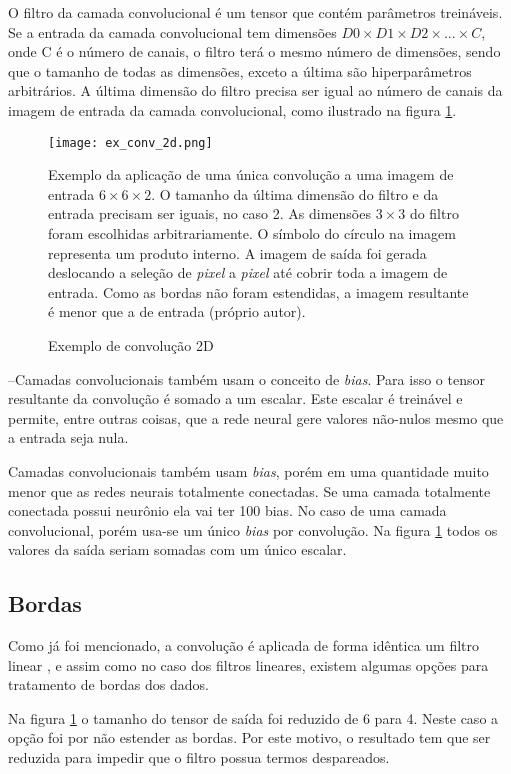 O filtro da camada convolucional é um tensor que contém parâmetros treináveis.
Se a entrada da camada convolucional tem dimensões
$D0 \times D1 \times D2 \times ... \times C$, onde C é o número de canais,
o filtro terá o mesmo número de dimensões, sendo que o tamanho de todas
as dimensões, exceto a última são
hiperparâmetros arbitrários. A última dimensão do filtro precisa ser igual ao
número de canais da imagem de entrada da camada convolucional, como ilustrado na
figura \ref{fig:ex_conv_2d}.


\begin{figure}[!htb]
	\centering
	\texttt{[image: ex\_conv\_2d.png]}
	\caption{Exemplo de convolução 2D}
	\label{fig:ex_conv_2d}
	Exemplo da aplicação de uma única convolução a uma imagem de
	entrada $6 \times 6 \times 2$. O tamanho da última dimensão do filtro e
	da entrada precisam ser iguais, no caso 2. As dimensões $3 \times 3$ do
	filtro foram escolhidas arbitrariamente. O símbolo do círculo na imagem
	representa um produto interno. A imagem de saída foi gerada deslocando
	a seleção de \emph{pixel} a \emph{pixel} até cobrir toda a
	imagem de entrada. Como as bordas não foram estendidas, a imagem
	resultante é menor que a de entrada (próprio autor).
\end{figure}

--Camadas convolucionais também usam o conceito de \emph{bias}. Para isso o tensor
resultante da convolução é somado a um escalar. Este escalar é treinável e
permite, entre outras coisas, que a rede neural gere valores não-nulos mesmo que
a entrada seja nula.

Camadas convolucionais também usam \emph{bias}, porém em uma quantidade muito
menor que as redes neurais totalmente conectadas. Se uma camada totalmente
conectada possui neurônio ela vai ter 100 bias. No caso de uma camada
convolucional, porém usa-se um único \emph{bias} por convolução. Na figura
\ref{fig:ex_conv_2d} todos os valores da saída seriam somadas com um único
escalar.

\subsection{Bordas} \label{ses:bordas}
Como já foi mencionado, a convolução é aplicada de forma idêntica
um filtro linear \cite{gonzalezwoods200708}, e assim como no caso dos
filtros lineares, existem algumas opções para tratamento de bordas dos dados.

Na figura \ref{fig:ex_conv_2d} o tamanho do tensor de saída foi reduzido
de 6 para 4. Neste caso a opção foi por não estender as bordas. Por
este motivo, o resultado tem que ser reduzida para impedir que o filtro
possua termos despareados.

